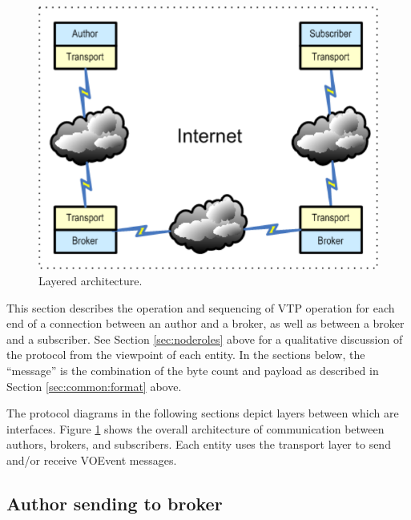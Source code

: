 \documentclass[a4paper,11pt]{ivoa}
\begin{document}
\begin{figure}
  \begin{center}
  \includegraphics{figures/architecture.pdf}
  \end{center}

  \caption{Layered architecture.}

  \label{fig:architecture}
\end{figure}

This section describes the operation and sequencing of VTP operation for each
end of a connection between an author and a broker, as well as between a
broker and a subscriber. See Section \ref{sec:noderoles} above for a
qualitative discussion of the protocol from the viewpoint of each entity. In
the sections below, the ``message'' is the combination of the byte count and
payload as described in Section \ref{sec:common:format} above.

The protocol diagrams in the following sections depict layers between which
are interfaces. Figure \ref{fig:architecture} shows the overall architecture
of communication between authors, brokers, and subscribers. Each entity uses
the transport layer to send and/or receive VOEvent messages.

\subsection{Author sending to broker}
\label{sec:protocol:authortobroker}
\end{document}
